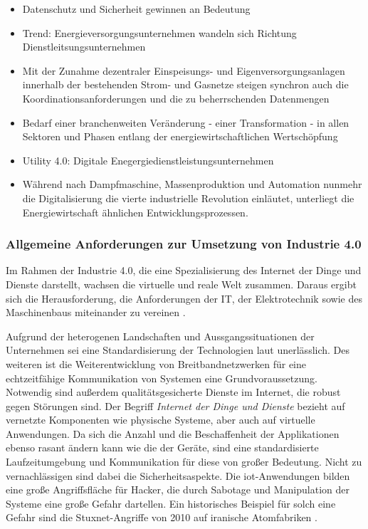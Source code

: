 \begin{itemize}
\begin{enumerate}
  \end{enumerate}
  \item Datenschutz und Sicherheit gewinnen an Bedeutung
  \item Trend: Energieversorgungsunternehmen wandeln sich Richtung Dienstleitsungsunternehmen
  \item \glqq Mit der Zunahme dezentraler Einspeisungs- und Eigenversorgungsanlagen innerhalb der bestehenden Strom- und Gasnetze steigen synchron auch die Koordinationsanforderungen und die zu beherrschenden Datenmengen \grqq{} \citep[S. 7]{Doleski2016}
  \item \glqq Bedarf einer branchenweiten Veränderung - einer Transformation - in allen Sektoren und Phasen entlang der energiewirtschaftlichen Wertschöpfung\grqq{} \cite[S. 11]{Doleski2016}
  \item Utility 4.0: Digitale Enegergiedienstleistungsunternehmen
  \item Während nach Dampfmaschine, Massenproduktion und Automation nunmehr die Digitalisierung die vierte industrielle Revolution einläutet, unterliegt die Energiewirtschaft ähnlichen Entwicklungsprozessen.
\end{itemize}

\subsubsection{Allgemeine Anforderungen zur Umsetzung von Industrie 4.0}\label{general}

Im Rahmen der Industrie 4.0, die eine Spezialisierung des Internet der Dinge und Dienste darstellt, wachsen die virtuelle und reale Welt zusammen. Daraus ergibt sich die Herausforderung, die Anforderungen der IT, der Elektrotechnik sowie des Maschinenbaus miteinander zu vereinen \citep{Huebner2017}.

Aufgrund der heterogenen Landschaften und Aussgangssituationen der Unternehmen sei eine Standardisierung der Technologien laut \citet{Bauer2014} unerlässlich. Des weiteren ist die Weiterentwicklung von Breitbandnetzwerken für eine echtzeitfähige Kommunikation von Systemen eine Grundvoraussetzung. Notwendig sind außerdem qualitätsgesicherte Dienste im Internet, die robust gegen Störungen sind. Der Begriff \textit{Internet der Dinge und Dienste} bezieht auf vernetzte Komponenten wie physische Systeme, aber auch auf virtuelle Anwendungen. Da sich die Anzahl und die Beschaffenheit der Applikationen ebenso rasant ändern kann wie die der Geräte, sind eine standardisierte Laufzeitumgebung und Kommunikation für diese von großer Bedeutung. Nicht zu vernachlässigen sind dabei die Sicherheitsaspekte. Die \ac{iot}-Anwendungen bilden eine große Angriffsfläche für Hacker, die durch Sabotage und Manipulation der Systeme eine große Gefahr dartellen. Ein historisches Beispiel für solch eine Gefahr sind die Stuxnet-Angriffe von 2010 auf iranische Atomfabriken \citep{Bauer2014}.

